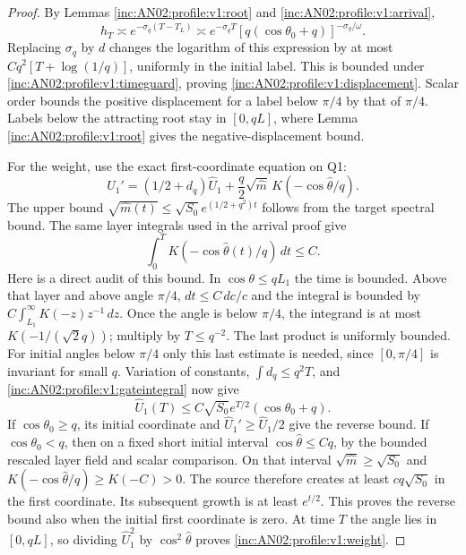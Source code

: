 \documentclass[11pt]{article}
\numberwithin{equation}{section}
\theoremstyle{remark}\newtheorem{remark}[theorem]{Remark}
\newcommand{\dd}{\,d}\newcommand{\E}{\mathbb E}\newcommand{\R}{\mathbb R}
\begin{document}
\begin{proof}
By Lemmas \ref{inc:AN02:profile:v1:root} and \ref{inc:AN02:profile:v1:arrival},
\[
 h_T\asymp e^{-\sigma_q(T-T_L)}
 \asymp e^{-\sigma_q T}[q(\cos\theta_0+q)]^{-\sigma_q/\omega}.
\]
Replacing $\sigma_q$ by $d$ changes the logarithm of this expression by at most $Cq^2[T+\log(1/q)]$, uniformly in the initial label. This is bounded under \eqref{inc:AN02:profile:v1:timeguard}, proving \eqref{inc:AN02:profile:v1:displacement}. Scalar order bounds the positive displacement for a label below $\pi/4$ by that of $\pi/4$. Labels below the attracting root stay in $[0,qL]$, where Lemma \ref{inc:AN02:profile:v1:root} gives the negative-displacement bound.

For the weight, use the exact first-coordinate equation on Q1:
\[
 \widehat U_1'=(1/2+d_q)\widehat U_1
              +\frac q2\sqrt{\widehat m}\,K(-\cos\widehat\theta/q).
\]
The upper bound $\sqrt{\widehat m(t)}\le\sqrt{S_0}e^{(1/2+q^2)t}$ follows from the target spectral bound. The same layer integrals used in the arrival proof give
\begin{equation}\label{inc:AN02:profile:v1:gateintegral}
 \int_0^T K(-\cos\widehat\theta(t)/q)\dd t\le C.
\end{equation}
Here is a direct audit of this bound. In $\cos\theta\le qL_1$ the time is bounded. Above that layer and above angle $\pi/4$, $dt\le C\,dc/c$ and the integral is bounded by $C\int_{L_1}^\infty K(-z)z^{-1}\dd z$. Once the angle is below $\pi/4$, the integrand is at most $K(-1/(\sqrt2q))$; multiply by $T\le q^{-2}$. The last product is uniformly bounded. For initial angles below $\pi/4$ only this last estimate is needed, since $[0,\pi/4]$ is invariant for small $q$.
Variation of constants, $\int d_q\le q^2T$, and \eqref{inc:AN02:profile:v1:gateintegral} now give
\[
 \widehat U_1(T)\le C\sqrt{S_0}e^{T/2}(\cos\theta_0+q).
\]
If $\cos\theta_0\ge q$, its initial coordinate and $\widehat U_1'\ge\widehat U_1/2$ give the reverse bound. If $\cos\theta_0<q$, then on a fixed short initial interval $\cos\widehat\theta\le Cq$, by the bounded rescaled layer field and scalar comparison. On that interval $\sqrt{\widehat m}\ge\sqrt{S_0}$ and $K(-\cos\widehat\theta/q)\ge K(-C)>0$. The source therefore creates at least $c q\sqrt{S_0}$ in the first coordinate. Its subsequent growth is at least $e^{t/2}$. This proves the reverse bound also when the initial first coordinate is zero. At time $T$ the angle lies in $[0,qL]$, so dividing $\widehat U_1^2$ by $\cos^2\widehat\theta$ proves \eqref{inc:AN02:profile:v1:weight}.


\end{proof}
\end{document}
